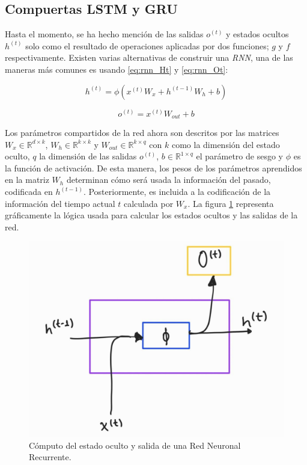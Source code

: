 \subsection{Compuertas LSTM y GRU}

Hasta el momento, se ha hecho mención de las salidas $o^{(t)}$ y estados ocultos $h^{(t)}$ solo como
el resultado de operaciones aplicadas por dos funciones; $g$ y $f$ respectivamente. Existen varias
alternativas de construir una \textit{RNN}, una de las maneras más comunes es usando
\ref{eq:rnn_Ht} y \ref{eq:rnn_Ot}:

\begin{equation}
    h^{(t)} = \phi(x^{(t)} W_{x} + h^{(t-1)} W_h + b)
    \label{eq:rnn_Ht}
\end{equation}

\begin{equation}
    o^{(t)} = x^{(t)} W_{out} + b
    \label{eq:rnn_Ot}
\end{equation}

Los parámetros compartidos de la red ahora son descritos por las matrices
$W_x \in \mathbb{R}^{d \times k}$, $W_h \in \mathbb{R}^{k \times k}$ y $
W_{out} \in \mathbb{R}^{k \times q}$ con $k$ como la dimensión del estado oculto, $q$ la dimensión
de las salidas $o^{(t)}$, $b \in \mathbb{R} ^ {1 \times q}$ el parámetro de sesgo y $\phi$ es la
función de activación. De esta manera, los pesos de los parámetros aprendidos en la matriz $W_h$
determinan cómo será usada la información del pasado, codificada en $h^{(t-1)}$. Posteriormente,
es incluida a la codificación de la información del tiempo actual $t$ calculada por $W_x$. La figura
\ref{fig:rnn_cell} representa gráficamente la lógica usada para calcular los estados ocultos y las
salidas de la red.


\begin{figure}[ht!]
\centering
\includegraphics[width=0.4 \textwidth]{Chapters/2. Transformer/Figures/rnn/rnn_cell.jpg}
\caption{Cómputo del estado oculto y salida de una Red Neuronal Recurrente.}
\label{fig:rnn_cell}
\end{figure}

